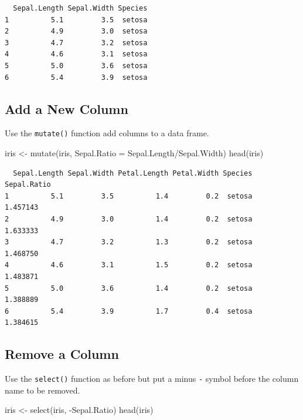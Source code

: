 \documentclass[
  letterpaper,
]{book}
\newenvironment{Shaded}{\begin{snugshade}}{\end{snugshade}}
\newcommand{\AttributeTok}[1]{\textcolor[rgb]{0.40,0.45,0.13}{#1}}
\newcommand{\FunctionTok}[1]{\textcolor[rgb]{0.28,0.35,0.67}{#1}}
\newcommand{\NormalTok}[1]{\textcolor[rgb]{0.00,0.23,0.31}{#1}}
\newcommand{\OtherTok}[1]{\textcolor[rgb]{0.00,0.23,0.31}{#1}}
\newcommand{\SpecialCharTok}[1]{\textcolor[rgb]{0.37,0.37,0.37}{#1}}
\begin{document}
\begin{verbatim}
  Sepal.Length Sepal.Width Species
1          5.1         3.5  setosa
2          4.9         3.0  setosa
3          4.7         3.2  setosa
4          4.6         3.1  setosa
5          5.0         3.6  setosa
6          5.4         3.9  setosa
\end{verbatim}

\subsection{Add a New Column}\label{add-a-new-column-1}

Use the \texttt{mutate()} function add columns to a data frame.

\begin{Shaded}
\begin{Highlighting}[]
\NormalTok{iris }\OtherTok{\textless{}{-}} \FunctionTok{mutate}\NormalTok{(iris, }\AttributeTok{Sepal.Ratio =}\NormalTok{ Sepal.Length}\SpecialCharTok{/}\NormalTok{Sepal.Width)}
\FunctionTok{head}\NormalTok{(iris)}
\end{Highlighting}
\end{Shaded}

\begin{verbatim}
  Sepal.Length Sepal.Width Petal.Length Petal.Width Species Sepal.Ratio
1          5.1         3.5          1.4         0.2  setosa    1.457143
2          4.9         3.0          1.4         0.2  setosa    1.633333
3          4.7         3.2          1.3         0.2  setosa    1.468750
4          4.6         3.1          1.5         0.2  setosa    1.483871
5          5.0         3.6          1.4         0.2  setosa    1.388889
6          5.4         3.9          1.7         0.4  setosa    1.384615
\end{verbatim}

\subsection{Remove a Column}\label{remove-a-column-1}

Use the \texttt{select()} function as before but put a minus
\texttt{\textquotesingle{}-\textquotesingle{}} symbol before the column
name to be removed.

\begin{Shaded}
\begin{Highlighting}[]
\NormalTok{iris }\OtherTok{\textless{}{-}} \FunctionTok{select}\NormalTok{(iris, }\SpecialCharTok{{-}}\NormalTok{Sepal.Ratio)}
\FunctionTok{head}\NormalTok{(iris)}
\end{Highlighting}
\end{Shaded}
\end{document}
